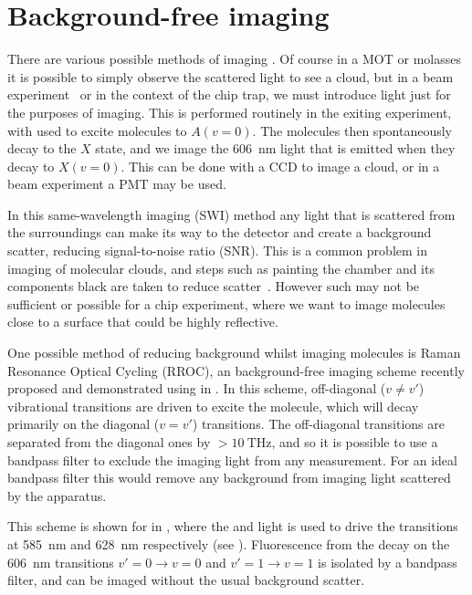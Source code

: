 \section{Background-free imaging}


There are various possible methods of imaging \CaF{}. Of course in a MOT or
molasses it is possible to simply observe the scattered light to see a cloud,
but in a beam experiment~\cite{} or in the context of the chip trap, we must
introduce light just for the purposes of imaging. This is performed routinely
in the exiting experiment, with  used to excite molecules to
$A(v=0)$. The molecules then spontaneously decay to the $X$ state, and we image
the \SI{606}{\nano\meter} light that is emitted when they decay to $X(v=0)$.
This can be done with a CCD to image a cloud, or in a beam experiment a PMT
may be used. 

In this same-wavelength imaging (SWI) method any light that is scattered from
the surroundings can make its way to the detector and create a background
scatter, reducing signal-to-noise ratio (SNR). This is a common problem in
imaging of molecular clouds, and steps such as painting the chamber and its
components black are taken to reduce scatter~\cite{}. However such 
may not be sufficient or possible for a chip experiment, where we want to image
molecules close to a surface that could be highly reflective.

One possible method of reducing background whilst imaging molecules is Raman
Resonance Optical Cycling (RROC), an background-free imaging scheme recently
proposed and demonstrated using \SrF{} in . In this scheme,
off-diagonal ($v\neq v'$) vibrational transitions are driven to excite the
molecule, which will decay primarily on the diagonal ($v=v'$) transitions. The
off-diagonal transitions are separated from the diagonal ones by
$>\SI{10}{\tera\hertz}$, and so it is possible to use a bandpass filter to
exclude the imaging light from any measurement. For an ideal bandpass filter
this would remove any background from imaging light scattered by the apparatus.

This scheme is shown for \CaF{} in , where
the  and  light is used to drive the transitions at
\SI{585}{\nano\meter} and \SI{628}{\nano\meter} respectively (see
). Fluorescence from the decay on the
\SI{606}{\nano\meter} transitions $v'=0\rightarrow v=0$ and $v'=1\rightarrow
v=1$ is isolated by a bandpass filter, and can be imaged without the usual
background scatter.

